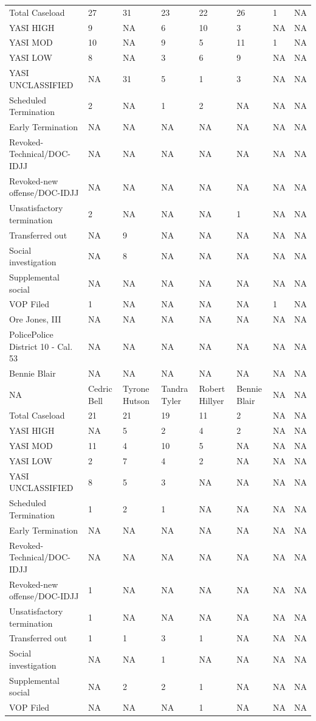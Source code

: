 \documentclass[12pt,]{article}
\begin{document}
\begin{table}[H]
{\begin{tabular}[t]{llllllll}
Total Caseload & 27 & 31 & 23 & 22 & 26 & 1 & NA\\
YASI HIGH & 9 & NA & 6 & 10 & 3 & NA & NA\\
YASI MOD & 10 & NA & 9 & 5 & 11 & 1 & NA\\
\addlinespace
YASI LOW & 8 & NA & 3 & 6 & 9 & NA & NA\\
YASI UNCLASSIFIED & NA & 31 & 5 & 1 & 3 & NA & NA\\
Scheduled Termination & 2 & NA & 1 & 2 & NA & NA & NA\\
Early Termination & NA & NA & NA & NA & NA & NA & NA\\
Revoked-Technical/DOC-IDJJ & NA & NA & NA & NA & NA & NA & NA\\
\addlinespace
Revoked-new offense/DOC-IDJJ & NA & NA & NA & NA & NA & NA & NA\\
Unsatisfactory termination & 2 & NA & NA & NA & 1 & NA & NA\\
Transferred out & NA & 9 & NA & NA & NA & NA & NA\\
Social investigation & NA & 8 & NA & NA & NA & NA & NA\\
Supplemental social & NA & NA & NA & NA & NA & NA & NA\\
\addlinespace
VOP Filed & 1 & NA & NA & NA & NA & 1 & NA\\
Ore Jones, III & NA & NA & NA & NA & NA & NA & NA\\
PolicePolice District 10 - Cal. 53 & NA & NA & NA & NA & NA & NA & NA\\
Bennie Blair & NA & NA & NA & NA & NA & NA & NA\\
NA & Cedric Bell & Tyrone Hutson & Tandra Tyler & Robert Hillyer & Bennie Blair & NA & NA\\
\addlinespace
Total Caseload & 21 & 21 & 19 & 11 & 2 & NA & NA\\
YASI HIGH & NA & 5 & 2 & 4 & 2 & NA & NA\\
YASI MOD & 11 & 4 & 10 & 5 & NA & NA & NA\\
YASI LOW & 2 & 7 & 4 & 2 & NA & NA & NA\\
YASI UNCLASSIFIED & 8 & 5 & 3 & NA & NA & NA & NA\\
\addlinespace
Scheduled Termination & 1 & 2 & 1 & NA & NA & NA & NA\\
Early Termination & NA & NA & NA & NA & NA & NA & NA\\
Revoked-Technical/DOC-IDJJ & NA & NA & NA & NA & NA & NA & NA\\
Revoked-new offense/DOC-IDJJ & 1 & NA & NA & NA & NA & NA & NA\\
Unsatisfactory termination & 1 & NA & NA & NA & NA & NA & NA\\
\addlinespace
Transferred out & 1 & 1 & 3 & 1 & NA & NA & NA\\
Social investigation & NA & NA & 1 & NA & NA & NA & NA\\
Supplemental social & NA & 2 & 2 & 1 & NA & NA & NA\\
VOP Filed & NA & NA & NA & 1 & NA & NA & NA\\
\bottomrule
\end{tabular}}
\end{table}
\end{document}
